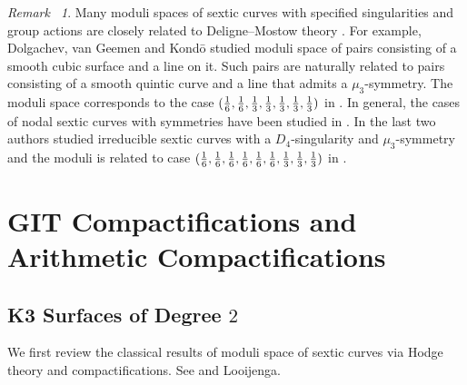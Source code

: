 \documentclass[12pt,reqno,a4paper]{amsart}
\theoremstyle{remark}
\newtheorem{rmk}[thm]{Remark~}
\theoremstyle{definition}
\begin{document}
\begin{rmk}
Many moduli spaces of sextic curves with specified singularities and group actions are closely related to Deligne--Mostow theory \cite{deligne1986monodromy}. For example, Dolgachev, van Geemen and Kond\=o \cite{dolgachev2005complex} studied moduli space of pairs consisting of a smooth cubic surface and a line on it. Such pairs are naturally related to pairs consisting of a smooth quintic curve and a line that admits a $\mu_3$-symmetry. The moduli space corresponds to
the case $({1\over 6}, {1\over 6}, {1\over 3}, {1\over 3}, {1\over 3}, {1\over 3}, {1\over 3})$ in \cite{mostow1988discontinuous}. In general, the cases of nodal sextic curves with symmetries have been studied in \cite[\S 5]{yu2023moduli}. In \cite{zheng2024complex} the last two authors studied irreducible sextic curves with a $D_4$-singularity and $\mu_3$-symmetry and the moduli is related to case $({1\over 6}, {1\over 6}, {1\over 6}, {1\over 6}, {1\over 6}, {1\over 6}, {1\over 3}, {1\over 3}, {1\over 3})$ in \cite{mostow1988discontinuous}. 
\end{rmk}








\section{GIT Compactifications and Arithmetic Compactifications}
\label{section: compactification}

\subsection{K3 Surfaces of Degree $2$}
\label{subsection: Shah, Looijenga}
We first review the classical results of moduli space of sextic curves via Hodge theory and compactifications. 
See \cite{shah1980complete} and Looijenga.
\end{document}

